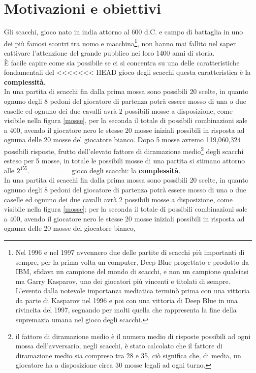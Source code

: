 \section{Motivazioni e obiettivi}
Gli scacchi, gioco nato in india attorno al 600 d.C. e campo di battaglia in uno dei più famosi scontri tra uomo e macchina\footnote{Nel 1996 e nel 1997 avvennero due delle partite di scacchi più importanti di sempre,
 per la prima volta un computer, Deep Blue progettato e prodotto da IBM, sfidava un campione del mondo di scacchi, e non un campione qualsiasi ma Garry Kasparov, uno dei giocatori più vincenti e titolati di sempre. 
 L'evento dalla notevole importanza mediatica terminò prima con una vittoria da parte di Kasparov nel 1996 e poi con una vittoria di Deep Blue in una rivincita del 1997, segnando per molti quella che rappresenta la
  fine della supremazia umana nel gioco degli scacchi. }, non hanno mai fallito nel saper cattivare  l'attenzione del grande pubblico nei loro 1400 anni di storia.
 \\È facile capire come sia possibile se ci si concentra su una delle caratteristiche fondamentali del 
<<<<<<< HEAD
 gioco degli scacchi  questa caratteristica è la \textbf{complessità}.\\In una partita di scacchi fin dalla prima mossa 
sono possibili 20 scelte, in quanto ognuno degli 8 pedoni del giocatore di partenza potrà essere mosso di una o due caselle ed ognuno dei due cavalli avrà 2 possibili mosse a disposizione, come visibile nella figura \ref{mosse}, per la seconda il totale di possibili combinazioni sale a 400, avendo il giocatore nero le stesse 20 mosse iniziali possibili in risposta ad ognuna delle 20 mosse del giocatore bianco.
 Dopo 5 mosse avremo 119,060,324 possibili risposte, frutto dell'elevato fattore di diramazione medio\footnote{ il fattore di diramazione medio è il numero medio di risposte possibili ad ogni mossa dell'avversario, negli scacchi, è stato calcolato che il fattore di diramazione medio sia compreso tra 28 e 35, ciò significa che, di media, un giocatore ha a disposizione circa 30 mosse legali ad ogni turno.} degli scacchi esteso per 5 mosse, in totale le possibili mosse di una partita si stimano attorno alle \(2^{155} \).
=======
 gioco degli scacchi: la \textbf{complessità}.\\In una partita di scacchi fin dalla prima mossa 
sono possibili 20 scelte, in quanto ognuno degli 8 pedoni del giocatore di partenza potrà essere mosso di una o due caselle ed ognuno dei due cavalli avrà 2 possibili mosse a disposizione, come visibile nella figura \ref{mosse}; per la seconda il totale di possibili combinazioni sale a 400, avendo il giocatore nero le stesse 20 mosse iniziali possibili in risposta ad ognuna delle 20 mosse del giocatore bianco,
